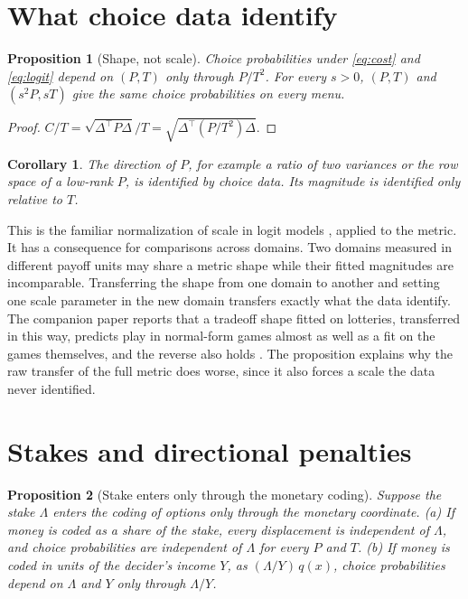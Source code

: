 \documentclass[11pt]{article}
\newtheorem{proposition}{Proposition}
\newtheorem{corollary}{Corollary}
\theoremstyle{definition}
\begin{document}
\section{What choice data identify}\label{sec:shape}

\begin{proposition}[Shape, not scale]\label{prop:scale}
Choice probabilities under \eqref{eq:cost} and \eqref{eq:logit} depend on $(P, T)$ only through $P/T^2$.
For every $s > 0$, $(P, T)$ and $(s^2 P, sT)$ give the same choice probabilities on every menu.
\end{proposition}

\begin{proof}
$C/T = \sqrt{\Delta^\top P \Delta}/T = \sqrt{\Delta^\top (P/T^2) \Delta}$.
\end{proof}

\begin{corollary}
The direction of $P$, for example a ratio of two variances or the row space of a low-rank $P$, is identified by choice data.
Its magnitude is identified only relative to $T$.
\end{corollary}

This is the familiar normalization of scale in logit models \citep{SwaitLouviere1993,Train2009}, applied to the metric.
It has a consequence for comparisons across domains.
Two domains measured in different payoff units may share a metric shape while their fitted magnitudes are incomparable.
Transferring the shape from one domain to another and setting one scale parameter in the new domain transfers exactly what the data identify.
The companion paper reports that a tradeoff shape fitted on lotteries, transferred in this way, predicts play in normal-form games almost as well as a fit on the games themselves, and the reverse also holds \citep{BondPartII}.
The proposition explains why the raw transfer of the full metric does worse, since it also forces a scale the data never identified.

\section{Stakes and directional penalties}\label{sec:identities}

\begin{proposition}[Stake enters only through the monetary coding]\label{prop:stake}
Suppose the stake $\Lambda$ enters the coding of options only through the monetary coordinate.
(a) If money is coded as a share of the stake, every displacement is independent of $\Lambda$, and choice probabilities are independent of $\Lambda$ for every $P$ and $T$.
(b) If money is coded in units of the decider's income $Y$, as $(\Lambda/Y)\,q(x)$, choice probabilities depend on $\Lambda$ and $Y$ only through $\Lambda/Y$.
\end{proposition}
\end{document}
